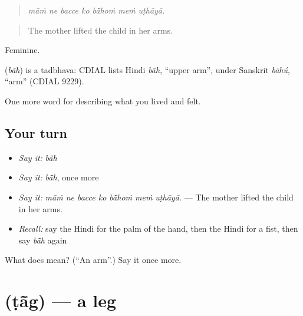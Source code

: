 \begin{quote}
      
\end{quote}

\begin{quote}
\emph{māṁ ne bacce ko bā̃hoṁ meṁ uṭhāyā.}
\end{quote}

\begin{quote}
The mother lifted the child in her arms.
\end{quote}

Feminine.

\begin{cousinweb}
\textbf{} (\emph{bā̃h}) is a tadbhava: CDIAL lists Hindi \emph{bā̃h}, \textquotedblleft{}upper arm\textquotedblright{}, under Sanskrit \emph{bāhú}, \textquotedblleft{}arm\textquotedblright{} (CDIAL 9229).
\end{cousinweb}

\begin{grammarlens}[title={What you've built}]
One more word for describing what you lived and felt.
\end{grammarlens}

\subsection*{Your turn}
\begin{itemize}
\raggedright
  \item \emph{Say it:} \emph{bā̃h}
  \item \emph{Say it:} \emph{bā̃h}, once more
  \item \emph{Say it:} \emph{māṁ ne bacce ko bā̃hoṁ meṁ uṭhāyā.} — The mother lifted the child in her arms.
  \item \emph{Recall:} say the Hindi for the palm of the hand, then the Hindi for a fist, then say \emph{bā̃h} again
\end{itemize}

\begin{tcolorbox}[breakable,colback=teal!4,colframe=teal!35!black,title={Before you move on}]
What does  mean? (\textquotedblleft{}An arm\textquotedblright{}.) Say it once more.
\end{tcolorbox}
\section[\texorpdfstring{\hi{टाँग} (ṭā̃g)}{टाँग (ṭā̃g)}]{ (ṭā̃g) — a leg}

